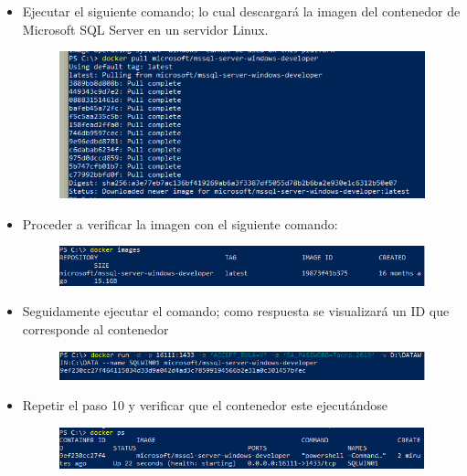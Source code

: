 \begin{itemize}
          \item Ejecutar el siguiente comando; lo cual descargará la imagen del contenedor de Microsoft SQL Server en un servidor Linux.
		\begin{figure}[H]
		\begin{center}
		\includegraphics[width=15cm]{./Imagenes/c1}
		\end{center}
		\end{figure}  
         \item Proceder a verificar la imagen con el siguiente comando:
		\begin{figure}[H]
		\begin{center}
		\includegraphics[width=15cm]{./Imagenes/c2}
		\end{center}
		\end{figure}  
          \item Seguidamente ejecutar el comando; como respuesta se visualizará un ID que corresponde al contenedor
		\begin{figure}[H]
		\begin{center}
		\includegraphics[width=15cm]{./Imagenes/c3}
		\end{center}
		\end{figure}  
          \item Repetir el paso 10 y verificar que el contenedor este ejecutándose
		\begin{figure}[H]
		\begin{center}
		\includegraphics[width=15cm]{./Imagenes/c4}

\end{center}
\end{figure}
\end{itemize}
